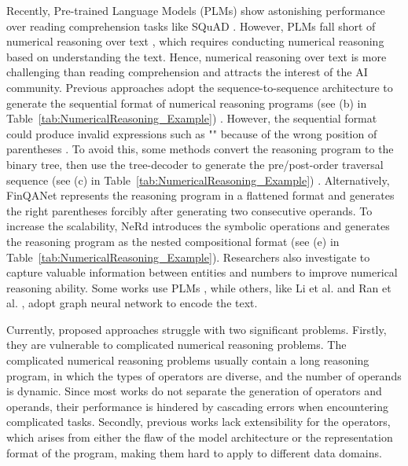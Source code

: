 \documentclass{article}
\begin{document}
Recently, Pre-trained Language Models (PLMs) \cite{BERT,RoBERTa,XLNet,GPT-3,T5} show astonishing performance over reading comprehension tasks like SQuAD \cite{squad}. However, PLMs fall short of numerical reasoning over text  \cite{NeRd}, which requires conducting numerical reasoning based on understanding the text. Hence, numerical reasoning over text is more challenging than reading comprehension \cite{ref_24} and attracts the interest of the AI community. Previous approaches adopt the sequence-to-sequence architecture to generate the sequential format of numerical reasoning programs (see (b) in Table~\ref{tab:NumericalReasoning_Example}) \cite{Math23K, ref_22}. However, the sequential format could produce invalid expressions such as "" because of the wrong position of parentheses \cite{ref_11}. To avoid this, some methods convert the reasoning program to the binary tree, then use the tree-decoder to generate the pre/post-order traversal sequence (see (c) in Table~\ref{tab:NumericalReasoning_Example}) \cite{ref_23, ref_13, ref_28}. Alternatively, FinQANet \cite{finqa} represents the reasoning program in a flattened format and generates the right parentheses forcibly after generating two consecutive operands. To increase the scalability, NeRd \cite{NeRd} introduces the symbolic operations and generates the reasoning program as the nested compositional format (see (e) in Table~\ref{tab:NumericalReasoning_Example}). Researchers also investigate to capture valuable information between entities and numbers to improve numerical reasoning ability. Some works use PLMs \cite{ref_24, NeRd, MWP-BERT}, while others, like Li et al. \cite{Graph2Tree} and Ran et al. \cite{NumNet}, adopt graph neural network to encode the text.

Currently, proposed approaches struggle with two significant problems. Firstly, they are vulnerable to complicated numerical reasoning problems. The complicated numerical reasoning problems usually contain a long reasoning program, in which the types of operators are diverse, and the number of operands is dynamic. Since most works do not separate the generation of operators and operands, their performance is hindered by cascading errors when encountering complicated tasks. Secondly, previous works lack extensibility for the operators, which arises from either the flaw of the model architecture or the representation format of the program, making them hard to apply to different data domains.
\end{document}
